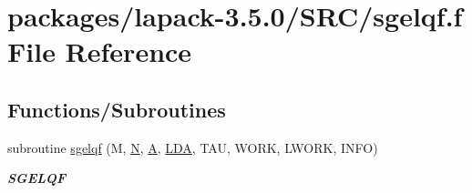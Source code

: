 \hypertarget{sgelqf_8f}{}\section{packages/lapack-\/3.5.0/\+S\+R\+C/sgelqf.f File Reference}
\label{sgelqf_8f}
\subsection*{Functions/\+Subroutines}
\begin{DoxyCompactItemize}
\item 
subroutine \hyperlink{group__realGEcomputational_gaff7dd464bee9a9ace7e576e4ecca33c0}{sgelqf} (M, \hyperlink{polmisc_8c_a0240ac851181b84ac374872dc5434ee4}{N}, \hyperlink{classA}{A}, \hyperlink{example__user_8c_ae946da542ce0db94dced19b2ecefd1aa}{L\+D\+A}, T\+A\+U, W\+O\+R\+K, L\+W\+O\+R\+K, I\+N\+F\+O)
\begin{DoxyCompactList}\small\item\em {\bfseries S\+G\+E\+L\+Q\+F} \end{DoxyCompactList}\end{DoxyCompactItemize}
